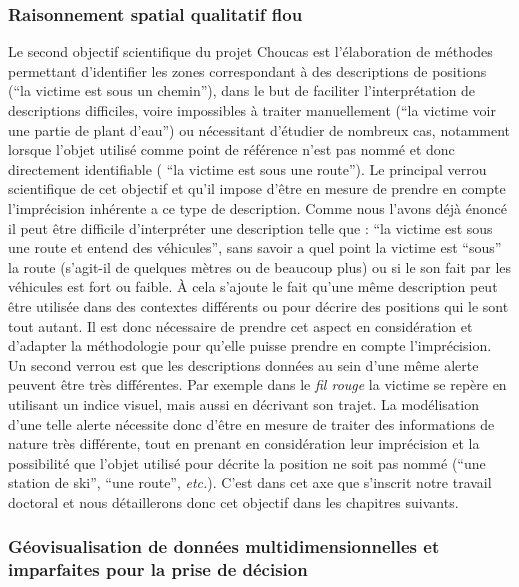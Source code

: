 \subsubsection{Raisonnement spatial qualitatif flou}
\label{subsec:1-2-3-2}

Le second objectif scientifique du projet Choucas est l’élaboration de
méthodes permettant d'identifier les zones correspondant à des
descriptions de positions (\eg \enquote{la victime est sous un
  chemin}), dans le but de faciliter l'interprétation de descriptions
difficiles, voire impossibles à traiter manuellement (\eg \enquote{la
  victime voir une partie de plant d'eau}) ou nécessitant d'étudier de
nombreux cas, notamment lorsque l'objet utilisé comme point de
référence n'est pas nommé et donc directement identifiable (\eg
\enquote{la victime est sous une route}). Le principal verrou
scientifique de cet objectif et qu'il impose d'être en mesure de
prendre en compte l'imprécision inhérente a ce type de
description. Comme nous l'avons déjà énoncé il peut être difficile
d'interpréter une description telle que : \enquote{la victime est sous
  une route et entend des véhicules}, sans savoir a quel point la
victime est \enquote{sous} la route (s'agit-il de quelques mètres ou
de beaucoup plus) ou si le son fait par les véhicules est fort ou
faible. À cela s'ajoute le fait qu'une même description peut être
utilisée dans des contextes différents ou pour décrire des positions
qui le sont tout autant. Il est donc nécessaire de prendre cet aspect
en considération et d'adapter la méthodologie pour qu'elle puisse
prendre en compte l'imprécision. Un second verrou est que les
descriptions données au sein d'une même alerte peuvent être très
différentes. Par exemple dans le \emph{fil rouge} la victime se repère
en utilisant un indice visuel, mais aussi en décrivant son trajet. La
modélisation d'une telle alerte nécessite donc d'être en mesure de
traiter des informations de nature très différente, tout en prenant en
considération leur imprécision et la possibilité que l'objet utilisé
pour décrite la position ne soit pas nommé (\eg \enquote{une station
  de ski}, \enquote{une route}, \emph{etc.}). C'est dans cet axe que
s'inscrit notre travail doctoral et nous détaillerons donc cet
objectif dans les chapitres suivants.

\subsubsection{Géovisualisation de données multidimensionnelles et
  imparfaites pour la prise de décision}
\label{subsec:1-2-3-3}

